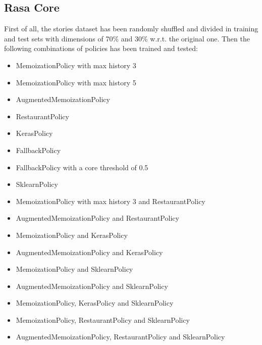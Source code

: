 \documentclass[11pt,a4paper]{article}
\begin{document}
\subsection{Rasa Core}

First of all, the stories dataset has been randomly shuffled and divided in training and test sets with dimensions of 70\% and 30\% w.r.t. the original one. Then the following combinations of policies has been trained and tested:

\begin{itemize}
\item MemoizationPolicy with max history 3
\item MemoizationPolicy with max history 5
\item AugmentedMemoizationPolicy
\item RestaurantPolicy
\item KerasPolicy
\item FallbackPolicy
\item FallbackPolicy with a core threshold of 0.5
\item SklearnPolicy
\item MemoizationPolicy with max history 3 and RestaurantPolicy
\item AugmentedMemoizationPolicy and RestaurantPolicy
\item MemoizationPolicy and KerasPolicy
\item AugmentedMemoizationPolicy and KerasPolicy
\item MemoizationPolicy and SklearnPolicy
\item AugmentedMemoizationPolicy and SklearnPolicy
\item MemoizationPolicy, KerasPolicy and SklearnPolicy
\item MemoizationPolicy, RestaurantPolicy and SklearnPolicy
\item AugmentedMemoizationPolicy, RestaurantPolicy and SklearnPolicy
\end{itemize}
\end{document}
